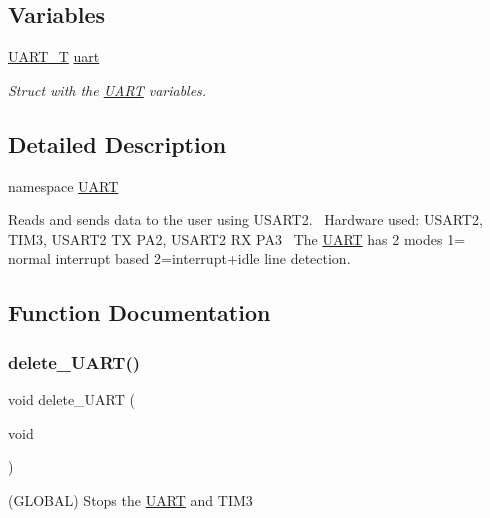 \subsection*{Variables}
\begin{DoxyCompactItemize}
\item 
\mbox{\hyperlink{struct_u_a_r_t_1_1_u_a_r_t___t}{U\+A\+R\+T\+\_\+T}} \mbox{\hyperlink{namespace_u_a_r_t_ad3d568c339fc1df943e142e2e931299c}{uart}}
\begin{DoxyCompactList}\small\item\em Struct with the \mbox{\hyperlink{namespace_u_a_r_t}{U\+A\+RT}} variables. \end{DoxyCompactList}\end{DoxyCompactItemize}


\subsection{Detailed Description}
namespace \mbox{\hyperlink{namespace_u_a_r_t}{U\+A\+RT}} 

Reads and sends data to the user using U\+S\+A\+R\+T2.~\newline
 Hardware used\+: U\+S\+A\+R\+T2, T\+I\+M3, U\+S\+A\+R\+T2 TX P\+A2, U\+S\+A\+R\+T2 RX P\+A3~\newline
 The \mbox{\hyperlink{namespace_u_a_r_t}{U\+A\+RT}} has 2 modes 1= normal interrupt based 2=interrupt+idle line detection.~\newline
 

\subsection{Function Documentation}
\mbox{\label{namespace_u_a_r_t_ab7d8037afb7dff98f21b6a07b3fc2158}} 
\subsubsection{\texorpdfstring{delete\+\_\+\+U\+A\+R\+T()}{delete\_UART()}}
{\footnotesize\ttfamily void delete\+\_\+\+U\+A\+RT (\begin{DoxyParamCaption}\item[{void}]{ }\end{DoxyParamCaption})}



(G\+L\+O\+B\+AL) Stops the \mbox{\hyperlink{namespace_u_a_r_t}{U\+A\+RT}} and T\+I\+M3 

